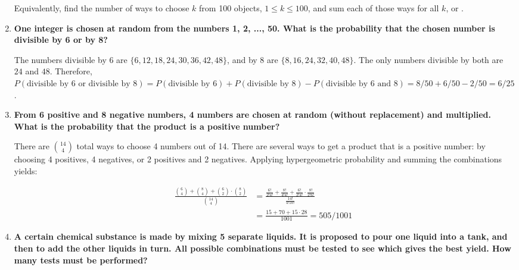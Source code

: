 \documentclass[10pt, oneside]{article}
\begin{document}
\begin{enumerate}[label=2.\arabic*]
  Equivalently, find the number of ways to choose $k$ from 100 objects, $1 \leq k \leq 100$, and sum each of those ways for all $k$, or .
\item \begin{tcolorbox}[
  colback=Cerulean!5!white,
  colframe=Cerulean!75!black]
  \textbf{One integer is chosen at random from the numbers 1, 2, ..., 50. What is the probability that the chosen number is divisible by 6 or by 8?}
  \end{tcolorbox}
  
  The numbers divisible by 6 are $\{ 6, 12, 18, 24, 30, 36, 42, 48 \}$, and by 8 are $\{ 8, 16, 24, 32, 40, 48 \}$. The only numbers divisible by both are $24$ and $48$. Therefore, $P(\text{divisible by 6 or divisible by 8}) = P(\text{divisible by 6}) + P(\text{divisible by 8}) - P(\text{divisible by 6 and 8}) = 8/50 + 6/50 - 2/50 = \boxed{6/25}$.
\item \begin{tcolorbox}[
  colback=Cerulean!5!white,
  colframe=Cerulean!75!black]
  \textbf{From 6 positive and 8 negative numbers, 4 numbers are chosen at random (without replacement) and multiplied. What is the probability that the product is a positive number?}
  \end{tcolorbox}
  
  There are $\binom{14}{4}$ total ways to choose 4 numbers out of 14. There are several ways to get a product that is a positive number: by choosing 4 positives, 4 negatives, or 2 positives and 2 negatives. Applying hypergeometric probability and summing the combinations yields:
  
  \begin{align*}
  \frac{\binom{6}{4} + \binom{8}{4} + \binom{6}{2} \cdot \binom{8}{2} }{\binom{14}{4}} &= \frac{ \frac{6!}{2! 4!} + \frac{8!}{4! 4!} + \frac{6!}{2! 4!} \cdot \frac{8!}{2! 6!} }{\frac{14!}{4! 10!}} \\
  &= \frac{15 + 70 + 15\cdot 28}{1001} = \boxed{505/1001}
  \end{align*}
\item \begin{tcolorbox}[
  colback=Cerulean!5!white,
  colframe=Cerulean!75!black]
  \textbf{A certain chemical substance is made by mixing 5 separate liquids. It is proposed to pour one liquid into a tank, and then to add the other liquids in turn. All possible combinations must be tested to see which gives the best yield. How many tests must be performed?}
  \end{tcolorbox}
  

\end{enumerate}
\end{document}
